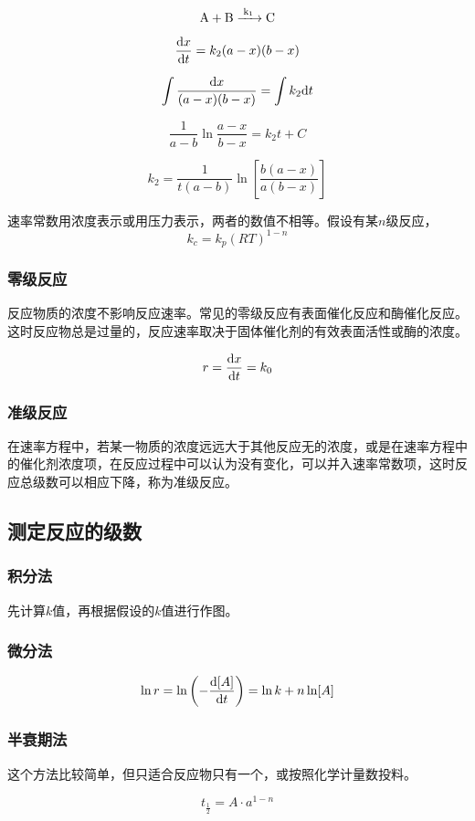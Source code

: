 \begin{equation*}
    \ce{A + B ->[k_1] C}
\end{equation*}

\begin{equation*}
    \frac{\mathrm{d} x}{\mathrm{d} t} = k_2 (a - x) (b - x)
\end{equation*}

\begin{equation*}
    \int \frac{\mathrm{d} x}{(a - x)(b - x)} = \int k_2 \mathrm{d} t
\end{equation*}

\begin{equation*}
    \frac{1}{a - b} \ln \frac{a - x}{b - x} = k_2 t + C
\end{equation*}

\begin{equation*}
    k_2 = \frac{1}{t(a - b)} \ln \left[ \frac{b(a - x)}{a(b - x)} \right]
\end{equation*}

速率常数用浓度表示或用压力表示，两者的数值不相等。假设有某$n$级反应，
\begin{equation*}
    k_c = k_p (RT)^{1 - n}
\end{equation*}
\subsubsection{零级反应}
反应物质的浓度不影响反应速率。常见的零级反应有表面催化反应和酶催化反应。这时反应物总是过量的，反应速率取决于固体催化剂的有效表面活性或酶的浓度。

\begin{equation*}
    r = \frac{\mathrm{d} x}{\mathrm{d} t} = k_0
\end{equation*}

\subsubsection{准级反应}
在速率方程中，若某一物质的浓度远远大于其他反应无的浓度，或是在速率方程中的催化剂浓度项，在反应过程中可以认为没有变化，可以并入速率常数项，这时反应总级数可以相应下降，称为准级反应。

\subsection{测定反应的级数}


\subsubsection{积分法}

先计算$k$值，再根据假设的$k$值进行作图。

\subsubsection{微分法}

\begin{equation*}
    \ln r = \ln \left( - \frac{\mathrm{d} [A]}{\mathrm{d} t} \right) = \ln k + n \ln [A]
\end{equation*}

\subsubsection{半衰期法}

这个方法比较简单，但只适合反应物只有一个，或按照化学计量数投料。

\begin{equation*}
    t_{\frac{1}{2}} = A \cdot a^{1 - n}
\end{equation*}